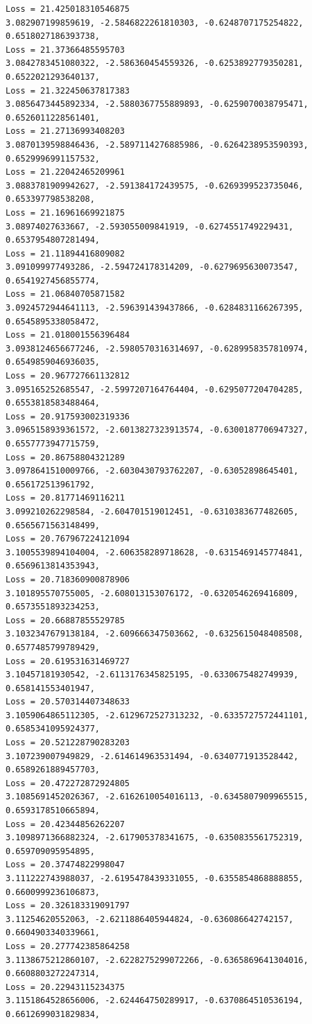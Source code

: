 \documentclass[11pt]{article}
\begin{document}
\begin{Verbatim}[commandchars=\\\{\}]
Loss = 21.425018310546875
3.082907199859619, -2.5846822261810303, -0.6248707175254822, 0.6518027186393738,
Loss = 21.37366485595703
3.0842783451080322, -2.586360454559326, -0.6253892779350281, 0.6522021293640137,
Loss = 21.322450637817383
3.0856473445892334, -2.5880367755889893, -0.6259070038795471,
0.6526011228561401,
Loss = 21.27136993408203
3.0870139598846436, -2.5897114276885986, -0.6264238953590393,
0.6529996991157532,
Loss = 21.22042465209961
3.0883781909942627, -2.591384172439575, -0.6269399523735046, 0.653397798538208,
Loss = 21.16961669921875
3.08974027633667, -2.593055009841919, -0.6274551749229431, 0.6537954807281494,
Loss = 21.11894416809082
3.091099977493286, -2.594724178314209, -0.6279695630073547, 0.6541927456855774,
Loss = 21.06840705871582
3.0924572944641113, -2.596391439437866, -0.6284831166267395, 0.6545895338058472,
Loss = 21.018001556396484
3.0938124656677246, -2.5980570316314697, -0.6289958357810974,
0.6549859046936035,
Loss = 20.967727661132812
3.095165252685547, -2.5997207164764404, -0.6295077204704285, 0.6553818583488464,
Loss = 20.917593002319336
3.0965158939361572, -2.6013827323913574, -0.6300187706947327,
0.6557773947715759,
Loss = 20.86758804321289
3.0978641510009766, -2.6030430793762207, -0.63052898645401, 0.656172513961792,
Loss = 20.81771469116211
3.099210262298584, -2.604701519012451, -0.6310383677482605, 0.6565671563148499,
Loss = 20.767967224121094
3.1005539894104004, -2.606358289718628, -0.6315469145774841, 0.6569613814353943,
Loss = 20.718360900878906
3.101895570755005, -2.608013153076172, -0.6320546269416809, 0.6573551893234253,
Loss = 20.66887855529785
3.1032347679138184, -2.609666347503662, -0.6325615048408508, 0.6577485799789429,
Loss = 20.619531631469727
3.10457181930542, -2.6113176345825195, -0.6330675482749939, 0.658141553401947,
Loss = 20.570314407348633
3.1059064865112305, -2.6129672527313232, -0.6335727572441101,
0.6585341095924377,
Loss = 20.521228790283203
3.107239007949829, -2.614614963531494, -0.6340771913528442, 0.6589261889457703,
Loss = 20.472272872924805
3.1085691452026367, -2.6162610054016113, -0.6345807909965515,
0.6593178510665894,
Loss = 20.42344856262207
3.1098971366882324, -2.617905378341675, -0.6350835561752319, 0.659709095954895,
Loss = 20.37474822998047
3.111222743988037, -2.6195478439331055, -0.6355854868888855, 0.6600999236106873,
Loss = 20.326183319091797
3.11254620552063, -2.6211886405944824, -0.636086642742157, 0.6604903340339661,
Loss = 20.277742385864258
3.1138675212860107, -2.6228275299072266, -0.6365869641304016,
0.6608803272247314,
Loss = 20.22943115234375
3.1151864528656006, -2.624464750289917, -0.6370864510536194, 0.6612699031829834,

\end{Verbatim}
\end{document}

